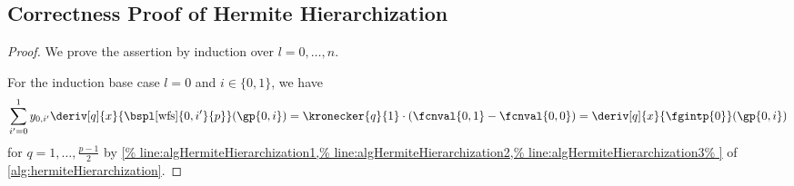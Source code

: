 \subsection{Correctness Proof of Hermite Hierarchization}
\label{sec:proofHermiteHierarchization}

\propInvariantHermiteHierarchization*

\begin{proof}
  We prove the assertion by induction over $l = 0, \dotsc, n$.
  
  For the induction base case $l = 0$ and $i \in \{0, 1\}$, we have
  \begin{equation}
    \sum_{i'=0}^1
    \linout{0,i'} \deriv[q]{x}{\bspl[\wfs]{0,i'}{p}}(\gp{0,i})
    = \kronecker{q}{1} \cdot (\fcnval{0,1} - \fcnval{0,0})
    = \deriv[q]{x}{\fgintp{0}}(\gp{0,i})
  \end{equation}
  for $q = 1, \dotsc, \frac{p-1}{2}$ by
  \cref{%
    line:algHermiteHierarchization1,%
    line:algHermiteHierarchization2,%
    line:algHermiteHierarchization3%
  }
  of \cref{alg:hermiteHierarchization}.
  

\end{proof}
